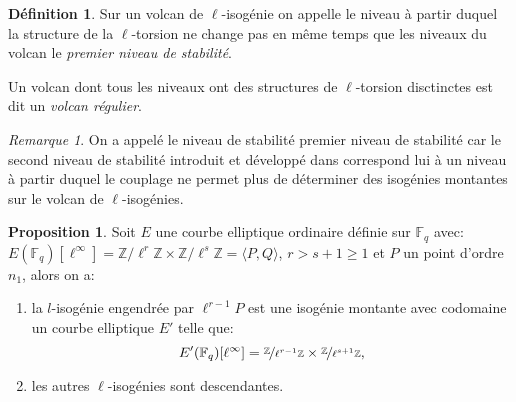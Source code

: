 \documentclass[10pt,a4paper]{book}
\theoremstyle{plain}
\theoremstyle{definition}
\theoremstyle{definition}
\theoremstyle{definition}
\newtheorem{prop}[thm]{Proposition}
\theoremstyle{definition}
\newtheorem{defi}[thm]{Définition}
\theoremstyle{remark}
\newtheorem{rem}[thm]{Remarque}
\theoremstyle{remark}
\theoremstyle{definition}
\begin{document}
\begin{defi}
Sur un volcan de $\ell$-isogénie on appelle le niveau à partir duquel la structure de la $\ell$-torsion ne change pas en même temps que les niveaux du volcan le \emph{premier niveau de stabilité}.

Un volcan dont tous les niveaux ont des structures de $\ell$-torsion disctinctes est dit un \emph{volcan régulier}.
\end{defi}


\begin{rem}
On a appelé le niveau de stabilité premier niveau de stabilité car le second niveau de stabilité introduit et développé dans \cite{Ionica-Joux10} correspond lui à un niveau à partir duquel le couplage ne permet plus de déterminer des isogénies montantes sur le volcan de $\ell$-isogénies.  
\end{rem}

\begin{prop} 
\label{pro:iso:mon}
Soit $E$ une courbe elliptique ordinaire définie sur $\mathbb{F}_q$ avec: $E(\mathbb{F}_q)[\ell^{\infty}]=\mathbb{Z}/\ell^{r}\mathbb{Z} \times \mathbb{Z}/\ell^{s}\mathbb{Z}= \langle P,Q \rangle $, $r>s +1 \geqslant  1$ et $P$ un point d'ordre $n_1$, alors on a:
\begin{enumerate}
\item la $l$-isogénie engendrée par $\ell^{r-1}P$ est une isogénie montante avec codomaine un courbe elliptique $E'$ telle que: \[E'(\mathbb{F}_q)[\ell^{\infty}]=\nicefrac{\mathbb{Z}}{\ell^{r-1}\mathbb{Z}} \times \nicefrac{\mathbb{Z}}{\ell^{s+1}\mathbb{Z}}, \]
\item les autres $\ell$-isogénies sont descendantes.
\end{enumerate}
\end{prop}
\end{document}
